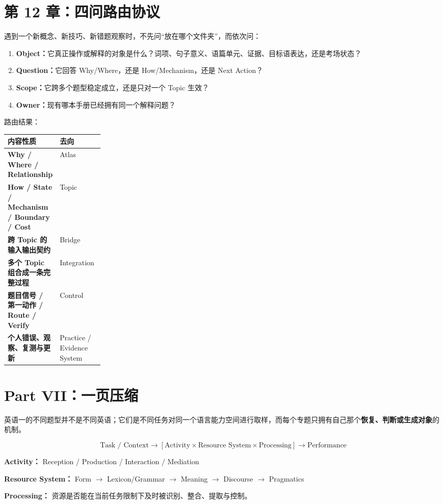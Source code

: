 \documentclass[11pt,a4paper]{ctexart}
\newcommand{\kw}[1]{\textbf{#1}}
\begin{document}
\section{第 12 章：四问路由协议}

遇到一个新概念、新技巧、新错题观察时，不先问“放在哪个文件夹”，而依次问：
\begin{enumerate}
  \item \kw{Object：}它真正操作或解释的对象是什么？词项、句子意义、语篇单元、证据、目标语表达，还是考场状态？
  \item \kw{Question：}它回答 Why/Where，还是 How/Mechanism，还是 Next Action？
  \item \kw{Scope：}它跨多个题型稳定成立，还是只对一个 Topic 生效？
  \item \kw{Owner：}现有哪本手册已经拥有同一个解释问题？
\end{enumerate}

路由结果：
\begin{center}
\small
\begin{tabularx}{\linewidth}{>{\bfseries}p{0.22\linewidth} X}
\toprule
内容性质 & 去向 \\
\midrule
Why / Where / Relationship & Atlas \\
How / State / Mechanism / Boundary / Cost & Topic \\
跨 Topic 的输入输出契约 & Bridge \\
多个 Topic 组合成一条完整过程 & Integration \\
题目信号 / 第一动作 / Route / Verify & Control \\
个人错误、观察、复测与更新 & Practice / Evidence System \\
\bottomrule
\end{tabularx}
\end{center}

\newpage
\section{Part VII：一页压缩}

\begin{corebox}[英语一的生成性总句]
英语一的不同题型并不是不同英语；它们是不同任务对同一个语言能力空间进行取样，而每个专题只拥有自己那个\kw{恢复、判断或生成对象}的机制。
\end{corebox}

\begin{statebox}[唯一母模型]
\[
\boxed{
\text{Task / Context}
\longrightarrow
\left[
\text{Activity}
\times
\text{Resource System}
\times
\text{Processing}
\right]
\longrightarrow
\text{Performance}
}
\]

\textbf{Activity：}
Reception / Production / Interaction / Mediation

\textbf{Resource System：}
Form $\to$ Lexicon/Grammar $\to$ Meaning $\to$ Discourse $\to$ Pragmatics

\textbf{Processing：}
资源是否能在当前任务限制下及时被识别、整合、提取与控制。
\end{statebox}
\end{document}
